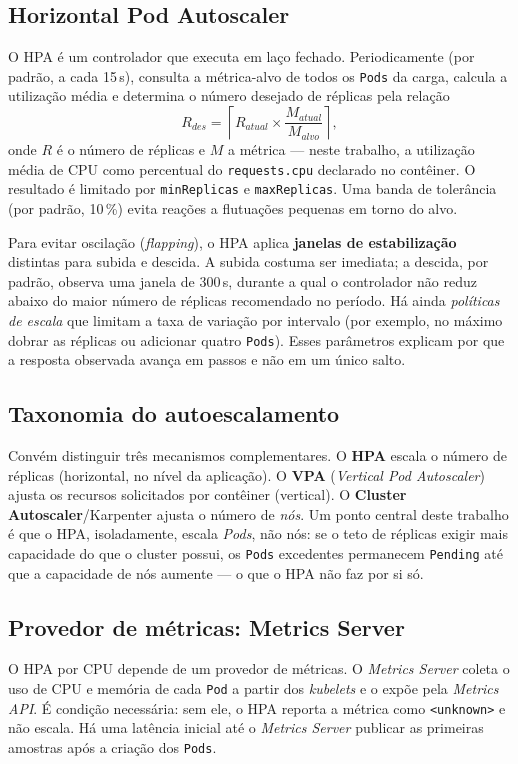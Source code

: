 \documentclass[conference]{IEEEtran}
\begin{document}
\subsection{Horizontal Pod Autoscaler}
O HPA é um controlador que executa em laço fechado. Periodicamente (por padrão, a cada 15\,s),
consulta a métrica-alvo de todos os \texttt{Pods} da carga, calcula a utilização média e
determina o número desejado de réplicas pela relação
\begin{equation}\label{eq:hpa}
R_{des} = \left\lceil R_{atual} \times \frac{M_{atual}}{M_{alvo}} \right\rceil,
\end{equation}
onde $R$ é o número de réplicas e $M$ a métrica --- neste trabalho, a utilização média de CPU
como percentual do \texttt{requests.cpu} declarado no contêiner. O resultado é limitado por
\texttt{minReplicas} e \texttt{maxReplicas}. Uma banda de tolerância (por padrão, 10\,\%) evita
reações a flutuações pequenas em torno do alvo.

Para evitar oscilação (\textit{flapping}), o HPA aplica \textbf{janelas de estabilização}
distintas para subida e descida. A subida costuma ser imediata; a descida, por padrão, observa
uma janela de 300\,s, durante a qual o controlador não reduz abaixo do maior número de réplicas
recomendado no período. Há ainda \textit{políticas de escala} que limitam a taxa de variação por
intervalo (por exemplo, no máximo dobrar as réplicas ou adicionar quatro \texttt{Pods}). Esses
parâmetros explicam por que a resposta observada avança em passos e não em um único salto.

\subsection{Taxonomia do autoescalamento}
Convém distinguir três mecanismos complementares. O \textbf{HPA} escala o número de réplicas
(horizontal, no nível da aplicação). O \textbf{VPA} (\textit{Vertical Pod Autoscaler}) ajusta os
recursos solicitados por contêiner (vertical). O \textbf{Cluster Autoscaler}/Karpenter ajusta o
número de \emph{nós}. Um ponto central deste trabalho é que o HPA, isoladamente, escala
\emph{Pods}, não nós: se o teto de réplicas exigir mais capacidade do que o cluster possui, os
\texttt{Pods} excedentes permanecem \texttt{Pending} até que a capacidade de nós aumente --- o que
o HPA não faz por si só.

\subsection{Provedor de métricas: Metrics Server}
O HPA por CPU depende de um provedor de métricas. O \textit{Metrics Server} coleta o uso de CPU e
memória de cada \texttt{Pod} a partir dos \textit{kubelets} e o expõe pela \textit{Metrics API}.
É condição necessária: sem ele, o HPA reporta a métrica como \texttt{<unknown>} e não escala. Há
uma latência inicial até o \textit{Metrics Server} publicar as primeiras amostras após a criação
dos \texttt{Pods}.
\end{document}
